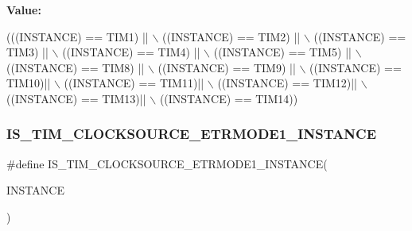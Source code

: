 {\bfseries Value\+:}
\begin{DoxyCode}
(((INSTANCE) == TIM1)  || \(\backslash\)
                                                  ((INSTANCE) == TIM2) || \(\backslash\)
                                                  ((INSTANCE) == TIM3) || \(\backslash\)
                                                  ((INSTANCE) == TIM4) || \(\backslash\)
                                                  ((INSTANCE) == TIM5) || \(\backslash\)
                                                  ((INSTANCE) == TIM8) || \(\backslash\)
                                                  ((INSTANCE) == TIM9) || \(\backslash\)
                                                  ((INSTANCE) == TIM10)|| \(\backslash\)
                                                  ((INSTANCE) == TIM11)|| \(\backslash\)
                                                  ((INSTANCE) == TIM12)|| \(\backslash\)
                                                  ((INSTANCE) == TIM13)|| \(\backslash\)
                                                  ((INSTANCE) == TIM14))
\end{DoxyCode}
\mbox{\label{group___exported__macros_ga0ca20886f56bf7611ad511433b9caade}} 
\subsubsection{\texorpdfstring{I\+S\+\_\+\+T\+I\+M\+\_\+\+C\+L\+O\+C\+K\+S\+O\+U\+R\+C\+E\+\_\+\+E\+T\+R\+M\+O\+D\+E1\+\_\+\+I\+N\+S\+T\+A\+N\+CE}{IS\_TIM\_CLOCKSOURCE\_ETRMODE1\_INSTANCE}}
{\footnotesize\ttfamily \#define I\+S\+\_\+\+T\+I\+M\+\_\+\+C\+L\+O\+C\+K\+S\+O\+U\+R\+C\+E\+\_\+\+E\+T\+R\+M\+O\+D\+E1\+\_\+\+I\+N\+S\+T\+A\+N\+CE(\begin{DoxyParamCaption}\item[{}]{I\+N\+S\+T\+A\+N\+CE }\end{DoxyParamCaption})}

